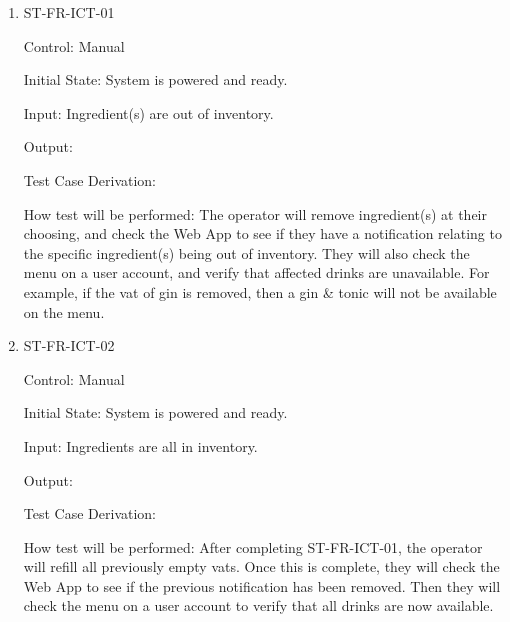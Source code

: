 \documentclass[12pt, titlepage]{article}
\begin{document}
\begin{enumerate}

\item{ST-FR-ICT-01\\}

Control: Manual
					
Initial State: System is powered and ready.
					
Input: Ingredient(s) are out of inventory.
					
Output: 

Test Case Derivation: 
					
How test will be performed: The operator will remove ingredient(s) at their choosing, and check the Web App to see if they have a notification relating to the specific ingredient(s) being out of inventory. They will also check the menu on a user account, and verify that affected drinks are unavailable. For example, if the vat of gin is removed, then a gin & tonic will not be available on the menu.
					
\item{ST-FR-ICT-02\\}

Control: Manual

Initial State: System is powered and ready.

Input: Ingredients are all in inventory.

Output: 

Test Case Derivation: 

How test will be performed: After completing ST-FR-ICT-01, the operator will refill all previously empty vats. Once this is complete, they will check the Web App to see if the previous notification has been removed. Then they will check the menu on a user account to verify that all drinks are now available. 


\end{enumerate}
\end{document}
